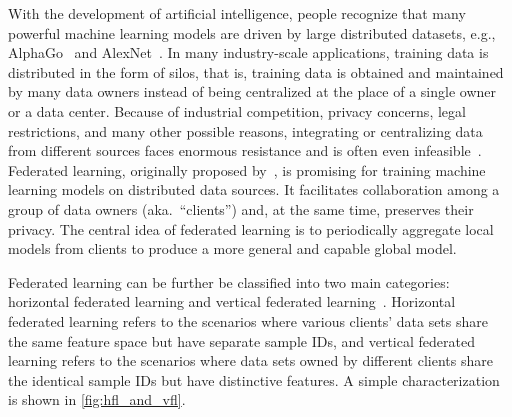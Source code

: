 With the development of artificial intelligence, people recognize that many powerful machine learning models are driven by large distributed datasets, e.g., AlphaGo~\citep{silver2016mastering} and AlexNet~\citep{krizhevsky2012imagenet}. In many industry-scale applications, training data is distributed in the form of silos, that is, training data is obtained and maintained by many data owners instead of being centralized at the place of a single owner or a data center. Because of industrial competition, privacy concerns, legal restrictions, and many other possible reasons, integrating or centralizing data from different sources faces enormous resistance and is often even infeasible~\cite{li2020review}. Federated learning, originally proposed by~\citet{federated2016}, is promising for training machine learning models on distributed data sources. It facilitates collaboration among a group of data owners (aka.~``clients'') and, at the same time, preserves their privacy. The central idea of federated learning is to periodically aggregate local models from clients to produce a more general and capable global model.

Federated learning can be further be classified into two main categories: horizontal federated learning and vertical federated learning~\cite{yang2019federated}. Horizontal federated learning refers to the scenarios where various clients' data sets share the same feature space but have separate sample IDs, and vertical federated learning refers to the scenarios where data sets owned by different clients share the identical sample IDs but have distinctive features. A simple characterization is shown in \autoref{fig:hfl_and_vfl}. 

